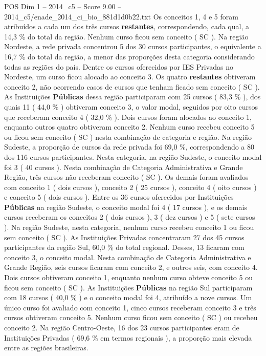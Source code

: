 \begin{textsample}{POS Dim 1 – 2014\_c5 – Score 9.00 – 2014\_c5/enade\_2014\_ci\_bio\_881d1d0b22.txt}
Os conceitos 1, 4 e 5 foram atribuídos a cada um dos três cursos \textbf{restantes}, correspondendo, cada qual, a 14,3 \% do total da região.
Nenhum curso ficou sem conceito ( SC ).
Na região Nordeste, a rede privada concentrou 5 dos 30 cursos participantes, o equivalente a 16,7 \% do total da região, a menor das proporções desta categoria considerando todas as regiões do país.
Dentre os cursos oferecidos por IES Privadas no Nordeste, um curso ficou alocado ao conceito 3.
Os quatro \textbf{restantes} obtiveram conceito 2, não ocorrendo casos de cursos que tenham ficado sem conceito ( SC ).
As Instituições \textbf{Públicas} dessa região participaram com 25 cursos ( 83,3 \% ), dos quais 11 ( 44,0 \% ) obtiveram conceito 3, o valor modal, seguidos por oito cursos que receberam conceito 4 ( 32,0 \% ).
Dois cursos foram alocados ao conceito 1, enquanto outros quatro obtiveram conceito 2.
Nenhum curso recebeu conceito 5 ou ficou sem conceito ( SC ) nesta combinação de categoria e região.
Na região Sudeste, a proporção de cursos da rede privada foi 69,0 \%, correspondendo a 80 dos 116 cursos participantes.
Nesta categoria, na região Sudeste, o conceito modal foi 3 ( 40 cursos ).
Nesta combinação de Categoria Administrativa e Grande Região, três cursos não receberam conceito ( SC ).
Os demais foram avaliados com conceito 1 ( dois cursos ), conceito 2 ( 25 cursos ), conceito 4 ( oito cursos ) e conceito 5 ( dois cursos ).
Entre os 36 cursos oferecidos por Instituições \textbf{Públicas} na região Sudeste, o conceito modal foi 4 ( 17 cursos ), e os demais cursos receberam os conceitos 2 ( dois cursos ), 3 ( dez cursos ) e 5 ( sete cursos ).
Na região Sudeste, nesta categoria, nenhum curso recebeu conceito 1 ou ficou sem conceito ( SC ).
As Instituições Privadas concentraram 27 dos 45 cursos participantes da região Sul, 60,0 \% do total regional.
Desses, 13 ficaram com conceito 3, o conceito modal.
Nesta combinação de Categoria Administrativa e Grande Região, seis cursos ficaram com conceito 2, e outros seis, com conceito 4.
Dois cursos obtiveram conceito 1, enquanto nenhum curso obteve conceito 5 ou ficou sem conceito ( SC ).
As Instituições \textbf{Públicas} na região Sul participaram com 18 cursos ( 40,0 \% ) e o conceito modal foi 4, atribuído a nove cursos.
Um único curso foi avaliado com conceito 1, cinco cursos receberam conceito 3 e três cursos obtiveram conceito 5.
Nenhum curso ficou sem conceito ( SC ) ou recebeu conceito 2.
Na região Centro-Oeste, 16 dos 23 cursos participantes eram de Instituições Privadas ( 69,6 \% em termos regionais ), a proporção mais elevada entre as regiões brasileiras.

\end{textsample}
